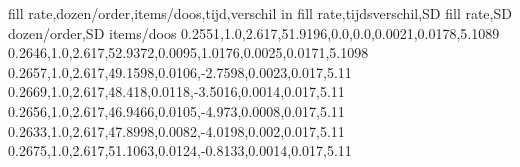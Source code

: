 fill rate,dozen/order,items/doos,tijd,verschil in fill rate,tijdsverschil,SD fill rate,SD dozen/order,SD items/doos
0.2551,1.0,2.617,51.9196,0.0,0.0,0.0021,0.0178,5.1089
0.2646,1.0,2.617,52.9372,0.0095,1.0176,0.0025,0.0171,5.1098
0.2657,1.0,2.617,49.1598,0.0106,-2.7598,0.0023,0.017,5.11
0.2669,1.0,2.617,48.418,0.0118,-3.5016,0.0014,0.017,5.11
0.2656,1.0,2.617,46.9466,0.0105,-4.973,0.0008,0.017,5.11
0.2633,1.0,2.617,47.8998,0.0082,-4.0198,0.002,0.017,5.11
0.2675,1.0,2.617,51.1063,0.0124,-0.8133,0.0014,0.017,5.11
